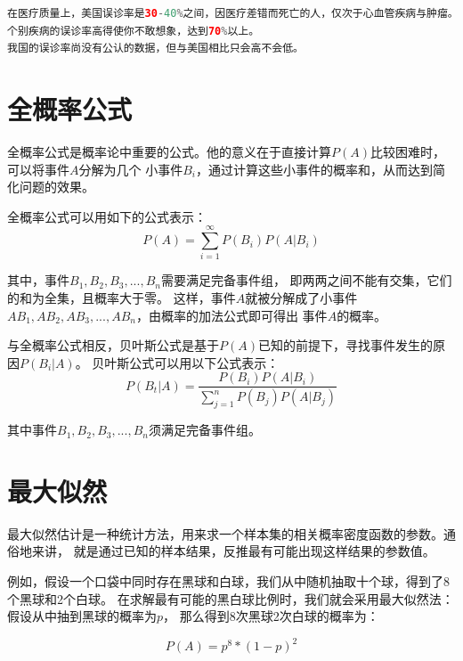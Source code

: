 \begin{lstlisting}[language=java]
在医疗质量上，美国误诊率是30-40%之间，因医疗差错而死亡的人，仅次于心血管疾病与肿瘤。
个别疾病的误诊率高得使你不敢想象，达到70%以上。
我国的误诊率尚没有公认的数据，但与美国相比只会高不会低。
\end{lstlisting}

\section{全概率公式}

全概率公式是概率论中重要的公式。他的意义在于直接计算$P(A)$比较困难时，可以将事件$A$分解为几个
小事件$B_i$，通过计算这些小事件的概率和，从而达到简化问题的效果。


全概率公式可以用如下的公式表示：
\begin{equation}
    P(A)=\sum_{i=1}^{\infty} P\left(B_{i}\right) P\left(A | B_{i}\right)
\end{equation}

\noindent
其中，事件$B_1,B_2,B_3,...,B_n$需要满足完备事件组，
即两两之间不能有交集，它们的和为全集，且概率大于零。
这样，事件$A$就被分解成了小事件$AB_1,AB_2,AB_3,...,AB_n$，由概率的加法公式即可得出
事件$A$的概率。


与全概率公式相反，贝叶斯公式是基于$P(A)$已知的前提下，寻找事件发生的原因$P(B_i|A)$。
贝叶斯公式可以用以下公式表示：
\begin{equation*}
    P\left(B_{t} | A\right)=\frac{P\left(B_{i}\right) P\left(A | B_{i}\right)}{\sum_{j=1}^{n} P\left(B_{j}\right) P\left(A | B_{j}\right)}
\end{equation*}

\noindent
其中事件$B_1,B_2,B_3,...,B_n$须满足完备事件组。

\section{最大似然}

最大似然估计是一种统计方法，用来求一个样本集的相关概率密度函数的参数。通俗地来讲，
就是通过已知的样本结果，反推最有可能出现这样结果的参数值。

例如，假设一个口袋中同时存在黑球和白球，我们从中随机抽取十个球，得到了8个黑球和2个白球。
在求解最有可能的黑白球比例时，我们就会采用最大似然法：假设从中抽到黑球的概率为$p$，
那么得到8次黑球2次白球的概率为：

\begin{equation*}
  P(A)=p^{8}*(1-p)^2
\end{equation*}

